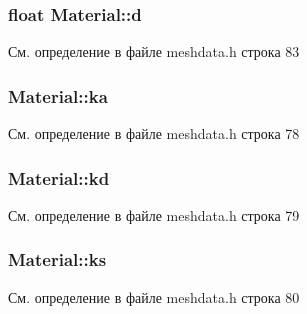 \subsubsection[{\texorpdfstring{d}{d}}]{\setlength{\rightskip}{0pt plus 5cm}float Material\+::d\hspace{0.3cm}{\ttfamily [private]}}\hypertarget{class_material_a72cb289b8dccb7a08e0b0f7880a92803}{}\label{class_material_a72cb289b8dccb7a08e0b0f7880a92803}


См. определение в файле meshdata.\+h строка 83

\subsubsection[{\texorpdfstring{ka}{ka}}]{ Material\+::ka\hspace{0.3cm}{\ttfamily [private]}}\hypertarget{class_material_a93cc771f8b2e9d1f273465e25504ea7b}{}\label{class_material_a93cc771f8b2e9d1f273465e25504ea7b}


См. определение в файле meshdata.\+h строка 78

\subsubsection[{\texorpdfstring{kd}{kd}}]{ Material\+::kd\hspace{0.3cm}{\ttfamily [private]}}\hypertarget{class_material_a42e6838a32f4a6b54a62a01afc4a1cdb}{}\label{class_material_a42e6838a32f4a6b54a62a01afc4a1cdb}


См. определение в файле meshdata.\+h строка 79

\subsubsection[{\texorpdfstring{ks}{ks}}]{ Material\+::ks\hspace{0.3cm}{\ttfamily [private]}}\hypertarget{class_material_a986cb019dc23c99fc139b16793c1ddb5}{}\label{class_material_a986cb019dc23c99fc139b16793c1ddb5}


См. определение в файле meshdata.\+h строка 80

